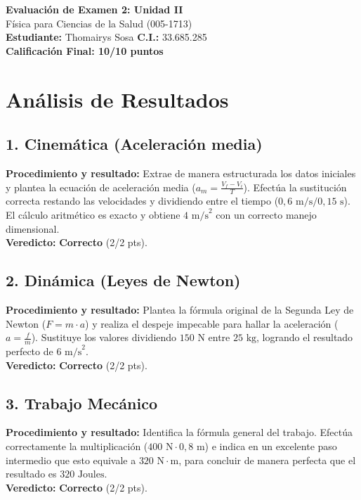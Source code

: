 \documentclass[12pt,letterpaper]{article}
\begin{document}
\begin{center}
    \Large \textbf{Evaluación de Examen 2: Unidad II} \\
    \large Física para Ciencias de la Salud (005-1713) \\
    \vspace{0.5cm}
    \textbf{Estudiante:} Thomairys Sosa \quad \textbf{C.I.:} 33.685.285
    \vspace{0.3cm} \\
    \large \textbf{Calificación Final: 10/10 puntos}
\end{center}

\vspace{0.5cm}

\section*{Análisis de Resultados}

\subsection*{1. Cinemática (Aceleración media)}
\textbf{Procedimiento y resultado:} Extrae de manera estructurada los datos iniciales y plantea la ecuación de aceleración media ($a_m = \frac{V_f - V_i}{T}$). Efectúa la sustitución correcta restando las velocidades y dividiendo entre el tiempo ($0,6 \text{ m/s} / 0,15 \text{ s}$). El cálculo aritmético es exacto y obtiene $4 \text{ m/s}^2$ con un correcto manejo dimensional. \\
\textbf{Veredicto:} \textbf{Correcto} (2/2 pts).

\subsection*{2. Dinámica (Leyes de Newton)}
\textbf{Procedimiento y resultado:} Plantea la fórmula original de la Segunda Ley de Newton ($F = m \cdot a$) y realiza el despeje impecable para hallar la aceleración ($a = \frac{f}{m}$). Sustituye los valores dividiendo $150 \text{ N}$ entre $25 \text{ kg}$, logrando el resultado perfecto de $6 \text{ m/s}^2$. \\
\textbf{Veredicto:} \textbf{Correcto} (2/2 pts).

\subsection*{3. Trabajo Mecánico}
\textbf{Procedimiento y resultado:} Identifica la fórmula general del trabajo. Efectúa correctamente la multiplicación ($400 \text{ N} \cdot 0,8 \text{ m}$) e indica en un excelente paso intermedio que esto equivale a $320 \text{ N} \cdot \text{m}$, para concluir de manera perfecta que el resultado es $320 \text{ Joules}$. \\
\textbf{Veredicto:} \textbf{Correcto} (2/2 pts).
\end{document}
